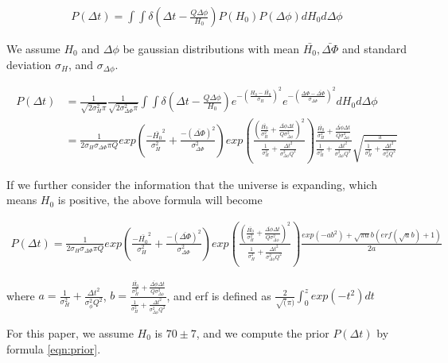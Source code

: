 \documentclass[\docopts]{\docclass}
\begin{document}
\begin{align}
P(\Delta t) = \int\int \delta(\Delta t - \frac{Q \Delta \phi }{H_0}) P(H_0)P(\Delta \phi) dH_0 d\Delta \phi
\end{align}

We assume $H_0$ and $\Delta \phi$ be gaussian distributions with mean $\bar{H_0}, \bar{\Delta \Phi}$ and standard deviation $\sigma_{H}$, and $\sigma_{\Delta \phi}$.

\begin{align}
P(\Delta t) &= \frac{1}{\sqrt{2\sigma_{H}^2\pi}}\frac{1}{\sqrt{2\sigma_{\Delta \Phi}^2\pi}}\int\int \delta(\Delta t - \frac{Q \Delta \phi}{H_0}) e^{-(\frac{H_0-\bar{H_0}}{\sigma_{H}})^2} e^{-(\frac{\Delta \Phi-\bar{\Delta \Phi}}{\sigma_{\Delta \Phi}})^2} dH_0 d\Delta \phi \\
&= \frac{1}{2\sigma_{H}\sigma_{\Delta \Phi}\pi Q} exp(\frac{-\bar{H_0}^2}{\sigma_H^2}+\frac{-(\bar{\Delta \Phi})^2}{\sigma_{\Delta \Phi}^2})
exp(\frac{(\frac{\bar{H_0}}{\sigma_H^2}+\frac{\bar{\Delta \phi}\Delta t}{Q\sigma_{\Delta \phi}^2})^2}{\frac{1}{\sigma_H^2}+\frac{\Delta t^2}{\sigma_{\Delta \phi}^2 Q^2}}) \frac{\frac{\bar{H_0}}{\sigma_H^2}+\frac{\bar{\Delta \phi}\Delta t}{Q\sigma_{\Delta \phi}^2}}{\frac{1}{\sigma_H^2}+\frac{\Delta t^2}{\sigma_{\Delta\phi}^2 Q^2}}
\sqrt{\frac{\pi}{\frac{1}{\sigma_H^2}+\frac{\Delta t^2}{\sigma_\phi^2Q^2}}}
\end{align}

If we further consider the information that the universe is expanding, which means $H_0$ is positive, the above formula will become

\begin{align}
\label{eqn:prior}
P(\Delta t) = \frac{1}{2\sigma_{H}\sigma_{\Delta \Phi}\pi Q} exp(\frac{-\bar{H_0}^2}{\sigma_H^2}+\frac{-(\bar{\Delta \Phi})^2}{\sigma_{\Delta \Phi}^2})
exp(\frac{(\frac{\bar{H_0}}{\sigma_H^2}+\frac{\bar{\Delta \phi}\Delta t}{Q\sigma_{\Delta \phi}^2})^2}{\frac{1}{\sigma_H^2}+\frac{\Delta t^2}{\sigma_{\Delta \phi}^2 Q^2}}) \frac{exp(-ab^2)+\sqrt{\pi a}b(erf(\sqrt{a}b)+1)}{2a}
\end{align}

 where $a=\frac{1}{\sigma_H^2}+\frac{\Delta t^2}{\sigma_\phi^2Q^2}$, $b=\frac{\frac{\bar{H_0}}{\sigma_H^2}+\frac{\bar{\Delta \phi}\Delta t}{Q\sigma_{\Delta \phi}^2}}{\frac{1}{\sigma_H^2}+\frac{\Delta t^2}{\sigma_{\Delta\phi}^2 Q^2}}$, and erf is defined as $\frac{2}{\sqrt(\pi)}\int_0^z exp(-t^2) dt$

For this paper, we assume $H_0$ is $70 \pm 7$, and we compute the prior $P(\Delta t)$ by formula \ref{eqn:prior}.
\end{document}
